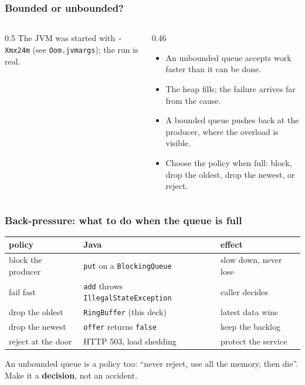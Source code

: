 \documentclass[aspectratio=169,10pt,compress]{beamer}
\begin{document}




\begin{frame}[t,fragile] \frametitle{Bounded or unbounded?}
  \begin{columns}[T]
    \begin{column}{0.5\textwidth}
      \small The JVM was started with \texttt{-Xmx24m} (see \texttt{Oom.jvmargs}); the run is real.
    \end{column}
    \begin{column}{0.46\textwidth}
      \begin{itemize}\small
        \item An unbounded queue accepts work faster than it can be done.
        \item The heap fills; the failure arrives far from the cause.
        \item A bounded queue pushes back at the producer, where the overload is visible.
        \item Choose the policy when full: block, drop the oldest, drop the newest, or reject.
      \end{itemize}
    \end{column}
  \end{columns}
\end{frame}




\begin{frame}[t,fragile] \frametitle{Back-pressure: what to do when the queue is full}
  \begin{center}\small
  \begin{tabular}{@{}lll@{}}
    \toprule
    \textbf{policy} & \textbf{Java} & \textbf{effect} \\
    \midrule
    block the producer   & \texttt{put} on a \texttt{BlockingQueue} & slow down, never lose \\
    fail fast            & \texttt{add} throws \texttt{IllegalStateException} & caller decides \\
    drop the oldest      & \texttt{RingBuffer} (this deck) & latest data wins \\
    drop the newest      & \texttt{offer} returns \texttt{false} & keep the backlog \\
    reject at the door   & HTTP 503, load shedding & protect the service \\
    \bottomrule
  \end{tabular}
  \end{center}
  \vspace{0.4em}
  \small An unbounded queue is a policy too: ``never reject, use all the memory, then die''. Make it a \textbf{decision}, not an accident.
\end{frame}
\end{document}
